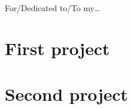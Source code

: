 \documentclass[10pt, twoside]{Thesis}
\begin{document}
\begin{glossary}
\end{glossary}



\begin{dedicatory}
	For/Dedicated to/To my\ldots
\end{dedicatory}




\mainmatter %



\part{First project}


% 

% 	


\part{Second project}


% 

% 	
\end{document}
